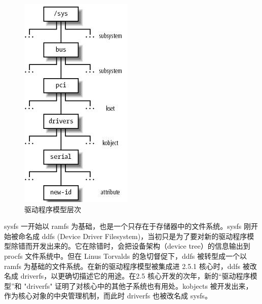 \begin{figure}[ht]
	\begin{center}
		\includegraphics[keepaspectratio,width=0.3\paperwidth]{Pictures/Kernel/DeviceDriverModelHierarchyExample.png}
	\caption{驱动程序模型层次}
	\label{fig:DeviceDriverModelHierarchyExample}
	\end{center}
\end{figure}

sysfs 一开始以 ramfs 为基础，也是一个只存在于存储器中的文件系统。sysfs 刚开始被命名成 ddfs (Device Driver Filesystem)，当初只是为了要对新的驱动程序模型除错而开发出来的。它在除错时，会把设备架构（device tree）的信息输出到 procfs 文件系统中。但在 Linus Torvalds 的急切督促下，ddfs 被转型成一个以 ramfs 为基础的文件系统。在新的驱动程序模型被集成进 2.5.1 核心时，ddfs 被改名成 driverfs，以更确切描述它的用途。在2.5 核心开发的次年，新的“驱动程序模型”和 "driverfs" 证明了对核心中的其他子系统也有用处。kobjects 被开发出来，作为核心对象的中央管理机制，而此时 driverfs 也被改名成 sysfs。



\clearpage
